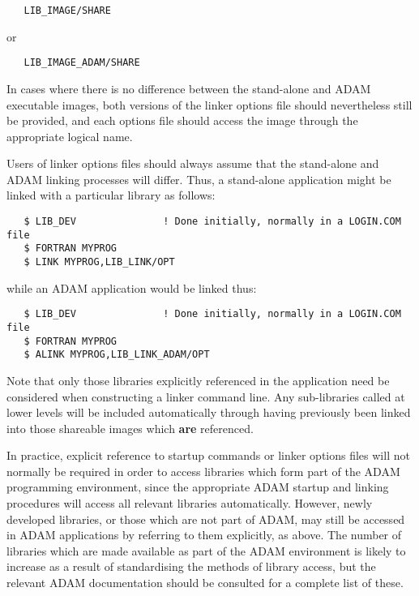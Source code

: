 \begin{verbatim}
   LIB_IMAGE/SHARE
\end{verbatim}

or

\begin{verbatim}
   LIB_IMAGE_ADAM/SHARE
\end{verbatim}

In cases where there is no difference between the stand-alone and ADAM
executable images, both versions of the linker options file should
nevertheless still be provided, and each options file should access the
image through the appropriate logical name.

Users of linker options files should always assume that the stand-alone and
ADAM linking processes will differ.
Thus, a stand-alone application might be linked with a particular library as
follows:

\begin{verbatim}
   $ LIB_DEV               ! Done initially, normally in a LOGIN.COM file
   $ FORTRAN MYPROG
   $ LINK MYPROG,LIB_LINK/OPT
\end{verbatim}

while an ADAM application would be linked thus:

\begin{verbatim}
   $ LIB_DEV               ! Done initially, normally in a LOGIN.COM file
   $ FORTRAN MYPROG
   $ ALINK MYPROG,LIB_LINK_ADAM/OPT
\end{verbatim}

Note that only those libraries explicitly referenced in the application need
be considered when constructing a linker command line.
Any sub-libraries called at lower levels will be included automatically
through having previously been linked into those shareable images which {\bf
are} referenced.

In practice, explicit reference to startup commands or linker options files
will not normally be required in order to access libraries which form part
of the ADAM programming environment, since the appropriate ADAM startup and
linking procedures will access all relevant libraries automatically.
However, newly developed libraries, or those which are not part of ADAM, may
still be accessed in ADAM applications by referring to them explicitly, as
above.
The number of libraries which are made available as part of the ADAM
environment is likely to increase as a result of standardising the methods
of library access, but the relevant ADAM documentation should be consulted
for a complete list of these.

